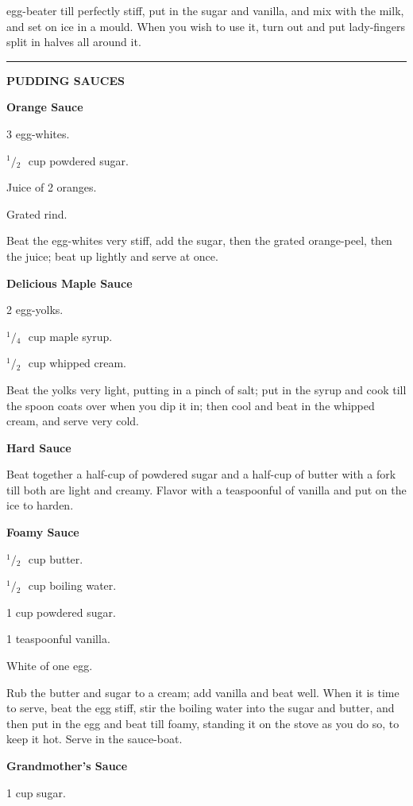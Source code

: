 \documentclass[11pt]{book}
\newcommand{\hstroke}{\rule[0.5ex]{5.0em}{0.2ex}}
\newcommand{\indpar}{\par\noindent\hspace*{\parindent}}
\newcommand{\ingredient}{\indpar}
\newcommand{\instruction}{\indpar}
\newcommand{\OneHalf}{\ensuremath{{}^1\!\!/\!{}_2\mbox{\ }}}
\newcommand{\OneQuarter}{\ensuremath{{}^1\!\!/\!{}_4\mbox{\ }}}
\newenvironment{RecipeTitle}{\medskip\begin{center}\large\bf }{\end{center}\smallskip}
\newenvironment{FoodTypeTitle}{\begin{center}\large\bf }{\end{center}}
\begin{document}
egg-beater till perfectly stiff, put in the sugar and
vanilla, and mix with the milk, and set on ice in a mould.
When you wish to use it, turn out and put lady-fingers split
in halves all around it.
\medskip
\begin{center}
\hstroke
\end{center}
\smallskip
\begin{FoodTypeTitle}
PUDDING SAUCES\label{PUDDING_SAUCES}
\end{FoodTypeTitle}
\begin{RecipeTitle}
Orange Sauce\label{orange_pudding_sauce}
\end{RecipeTitle}
\ingredient  3 egg-whites.
\ingredient  \OneHalf cup powdered sugar.
\ingredient  Juice of 2 oranges.
\ingredient  Grated rind.
\instruction  Beat the egg-whites very stiff, add the sugar, then the
grated orange-peel, then the juice; beat up lightly and serve
at once.
\begin{RecipeTitle}
Delicious Maple Sauce\label{delicious_maple_pudding_sauce}
\end{RecipeTitle}
\ingredient  2 egg-yolks.
\ingredient  \OneQuarter cup maple syrup.
\ingredient  \OneHalf cup whipped cream.
\instruction  Beat the yolks very light, putting in a pinch of salt; put
in the syrup and cook till the spoon coats over when you dip
it in; then cool and beat in the whipped cream, and serve very
cold.
\begin{RecipeTitle}
Hard Sauce\label{hard_pudding_sauce}
\end{RecipeTitle}
\instruction  Beat together a half-cup of powdered sugar and a half-cup of
butter with a fork till both are light and creamy.  Flavor
with a teaspoonful of vanilla and put on the ice to harden.
\begin{RecipeTitle}
Foamy Sauce\label{foamy_pudding_sauce}
\end{RecipeTitle}
\ingredient  \OneHalf cup butter.
\ingredient  \OneHalf cup boiling water.
\ingredient  1 cup powdered sugar.
\ingredient  1 teaspoonful vanilla.
\ingredient  White of one egg.
\instruction  Rub the butter and sugar to a cream; add vanilla and beat
well.  When it is time to serve, beat the egg stiff, stir the
boiling water into the sugar and butter, and then put in the
egg and beat till foamy, standing it on the stove as you do
so, to keep it hot.  Serve in the sauce-boat.\pagebreak[4]
\begin{RecipeTitle}
Grandmother's Sauce\label{grandmothers_pudding_sauce}
\end{RecipeTitle}
\ingredient  1 cup sugar.
\end{document}
